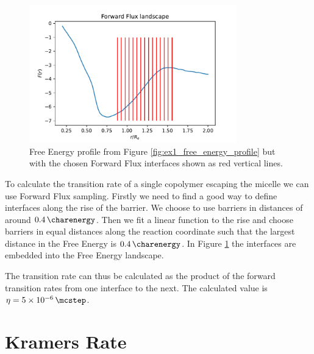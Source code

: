 \documentclass[../main.tex]{subfiles}
\begin{document}
\begin{figure}[htpb]
    \centering
    \includegraphics[width=0.8\textwidth]{../figures/ex2_forward_flux_landscape.pdf}
    \caption{Free Energy profile from Figure \ref{fig:ex1_free_energy_profile} but with the chosen Forward Flux interfaces shown as red vertical lines.}
    \label{fig:ex2_forward_flux_landscape}
\end{figure}

To calculate the transition rate of a single copolymer escaping the micelle we can use Forward Flux sampling.
Firstly we need to find a good way to define interfaces along the rise of the barrier.
We choose to use barriers in distances of around $\SI{.4}{\charenergy}$.
Then we fit a linear function to the rise and choose barriers in equal distances along the reaction coordinate such that the largest distance in the Free Energy is $\SI{.4}{\charenergy}$.
In Figure \ref{fig:ex2_forward_flux_landscape} the interfaces are embedded into the Free Energy landscape.
\par

The transition rate can thus be calculated as the product of the forward transition rates from one interface to the next.
The calculated value is $\eta = \SI{5e-6}{\per\mcstep}$.

\section{Kramers Rate}
\end{document}
